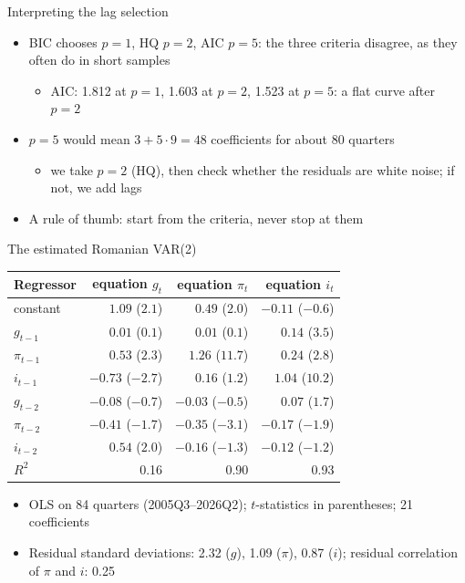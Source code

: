 \begin{frame}{Interpreting the lag selection}
\itemsize{\small}
\begin{itemize}
    \item BIC chooses $p = 1$, HQ $p = 2$, AIC $p = 5$: the three criteria disagree, as they often do in short samples
    \begin{itemize}
        \item AIC: 1.812 at $p = 1$, 1.603 at $p = 2$, 1.523 at $p = 5$: a flat curve after $p = 2$
    \end{itemize}
    \item $p = 5$ would mean $3 + 5 \cdot 9 = 48$ coefficients for about 80 quarters
    \begin{itemize}
        \item we take $p = 2$ (HQ), then check whether the residuals are white noise; if not, we add lags
    \end{itemize}
    \item A rule of thumb: start from the criteria, never stop at them
\end{itemize}
\end{frame}

\begin{frame}{The estimated Romanian VAR(2)}
\itemsize{\small}
\begin{center}
\scriptsize
\begin{tabular}{lrrr}
\toprule
\textbf{Regressor} & \textbf{equation $g_t$} & \textbf{equation $\pi_t$} & \textbf{equation $i_t$} \\
\midrule
constant & $1.09$ ($2.1$) & $0.49$ ($2.0$) & $-0.11$ ($-0.6$) \\
$g_{t-1}$ & $0.01$ ($0.1$) & $0.01$ ($0.1$) & $0.14$ ($3.5$) \\
$\pi_{t-1}$ & $0.53$ ($2.3$) & $1.26$ ($11.7$) & $0.24$ ($2.8$) \\
$i_{t-1}$ & $-0.73$ ($-2.7$) & $0.16$ ($1.2$) & $1.04$ ($10.2$) \\
$g_{t-2}$ & $-0.08$ ($-0.7$) & $-0.03$ ($-0.5$) & $0.07$ ($1.7$) \\
$\pi_{t-2}$ & $-0.41$ ($-1.7$) & $-0.35$ ($-3.1$) & $-0.17$ ($-1.9$) \\
$i_{t-2}$ & $0.54$ ($2.0$) & $-0.16$ ($-1.3$) & $-0.12$ ($-1.2$) \\
$R^2$ & 0.16 & 0.90 & 0.93 \\
\bottomrule
\end{tabular}
\end{center}
\begin{itemize}
    \item OLS on 84 quarters (2005Q3--2026Q2); $t$-statistics in parentheses; 21 coefficients
    \item Residual standard deviations: 2.32 ($g$), 1.09 ($\pi$), 0.87 ($i$); residual correlation of $\pi$ and $i$: 0.25
\end{itemize}
\end{frame}

